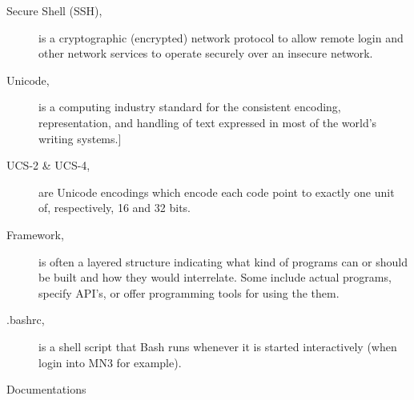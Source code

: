 \begin{description}
\item [Secure Shell (SSH),]  is a cryptographic (encrypted) network protocol to allow remote login and other network services to operate securely over an insecure network. 
\item [Unicode,] is a computing industry standard for the consistent encoding, representation, and handling of text expressed in most of the world's writing systems.]
\item [UCS-2 \& UCS-4, ] are Unicode encodings which encode each code point to exactly one unit of, respectively, 16 and 32 bits. 




\item[Framework,] is often a layered structure indicating what kind of programs can or should be built and how they would interrelate. Some include actual programs, specify API's, or offer programming tools for using the them.

\item [.bashrc,] is a shell script that Bash runs whenever it is started interactively (when login into MN3 for example).
\end{description}



Documentations

\label{sec:docs}

